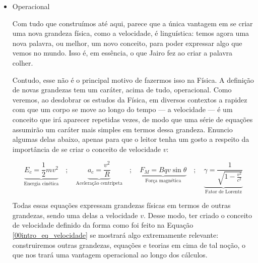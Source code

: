 \begin{itemize}
    

    

    \item [(iii)] Operacional

    Com tudo que construímos até aqui, parece que a única vantagem em se criar uma nova grandeza física, como a velocidade, é linguística: temos agora uma nova palavra, ou melhor, um novo conceito, para poder expressar algo que vemos no mundo. Isso é, em essência, o que Jairo fez ao criar a palavra colher.

    Contudo, esse não é o principal motivo de fazermos isso na Física. A definição de novas grandezas tem um caráter, acima de tudo, operacional. Como veremos, ao desdobrar os estudos da Física, em diversos contextos a rapidez com que um corpo se move ao longo do tempo --- a velocidade --- é um conceito que irá aparecer repetidas vezes, de modo que uma série de equações assumirão um caráter mais simples em termos dessa grandeza. Enuncio algumas delas abaixo, apenas para que o leitor tenha um gosto a respeito da importância de se criar o conceito de velocidade $v$:


\[
\underbrace{E_c = \frac{1}{2}mv^2}_{\text{Energia cinética}} \quad ; \quad
\underbrace{a_c = \frac{v^2}{R}}_{\text{Aceleração centrípeta}} \quad ; \quad 
\underbrace{F_M = Bqv\sin\theta}_{\text{Força magnética}} \quad ; \quad
\underbrace{\gamma = \frac{1}{\sqrt{1 - \frac{v^2}{c^2}}}}_{\text{Fator de Lorentz}}
\]


Todas essas equações expressam grandezas físicas em termos de outras grandezas, sendo uma delas a velocidade $v$. Desse modo, ter criado o conceito de velocidade definido da forma como foi feito na Equação \eqref{00intro_eq_velocidade} se mostrará algo extremamente relevante: construiremos outras grandezas, equações e teorias em cima de tal noção, o que nos trará uma vantagem operacional ao longo dos cálculos.

\end{itemize}



